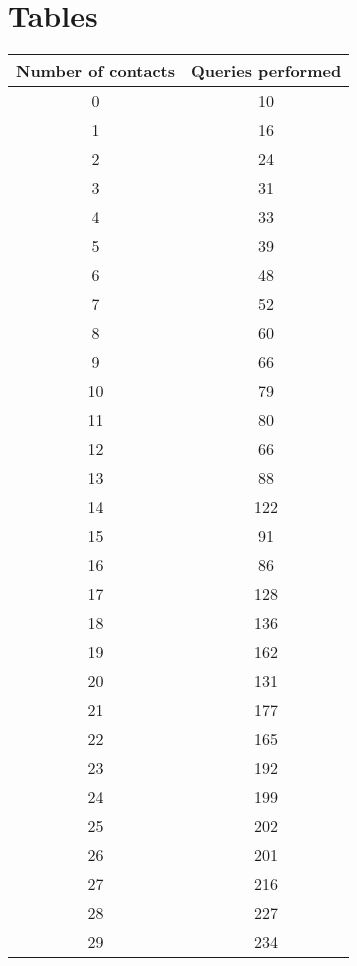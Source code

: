 \chapter{Tables}\label{chap:app:tables}

\begin{table}
  \begin{tabular}{|c|c|}
    \hline
    \textbf{Number of contacts} & \textbf{Queries performed} \\
    \hline
    0      & 10 \\
    \hline
    1      & 16 \\
    \hline
    2      & 24 \\
    \hline
    3      & 31 \\
    \hline
    4      & 33 \\
    \hline
    5      & 39 \\
    \hline
    6      & 48 \\
    \hline
    7      & 52 \\
    \hline
    8      & 60 \\
    \hline
    9      & 66 \\
    \hline
    10     & 79 \\
    \hline
    11     & 80 \\
    \hline
    12     & 66 \\
    \hline
    13     & 88 \\
    \hline
    14     & 122 \\
    \hline
    15     & 91 \\
    \hline
    16     & 86 \\
    \hline
    17     & 128 \\
    \hline
    18     & 136 \\
    \hline
    19     & 162 \\
    \hline
    20     & 131 \\
    \hline
    21     & 177 \\
    \hline
    22     & 165 \\
    \hline
    23     & 192 \\
    \hline
    24     & 199 \\
    \hline
    25     & 202 \\
    \hline
    26     & 201 \\
    \hline
    27     & 216 \\
    \hline
    28     & 227 \\
    \hline
    29     & 234 \\
    \hline

\end{tabular}
\end{table}
